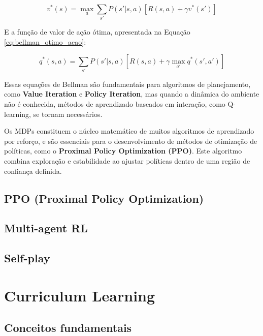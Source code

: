 \begin{equation}
\label{eq:bellman_otimo_estado}
v^*(s) = \max_a \sum_{s'} P(s'|s, a) \left[ R(s, a) + \gamma v^*(s') \right]
\end{equation}

E a função de valor de ação ótima, apresentada na Equação \ref{eq:bellman_otimo_acao}:

\begin{equation}
\label{eq:bellman_otimo_acao}
q^*(s, a) = \sum_{s'} P(s'|s, a) \left[ R(s, a) + \gamma \max_{a'} q^*(s', a') \right]
\end{equation}

Essas equações de Bellman são fundamentais para algoritmos de planejamento, como \textbf{Value Iteration} e \textbf{Policy Iteration}, mas quando a dinâmica do ambiente não é conhecida, métodos de aprendizado baseados em interação, como Q-learning, se tornam necessários.

Os MDPs constituem o núcleo matemático de muitos algoritmos de aprendizado por reforço, e são essenciais para o desenvolvimento de métodos de otimização de políticas, como o \textbf{Proximal Policy Optimization (PPO)}. Este algoritmo combina exploração e estabilidade ao ajustar políticas dentro de uma região de confiança definida.

\subsection{PPO (Proximal Policy Optimization)}
\label{subsec:ppo}

\subsection{Multi-agent RL}
\label{subsec:marl}

\subsection{Self-play}
\label{subsec:self_play}

\section{Curriculum Learning}
\label{sec:curriculum}

\subsection{Conceitos fundamentais}
\label{subsec:curriculum_conceitos}

